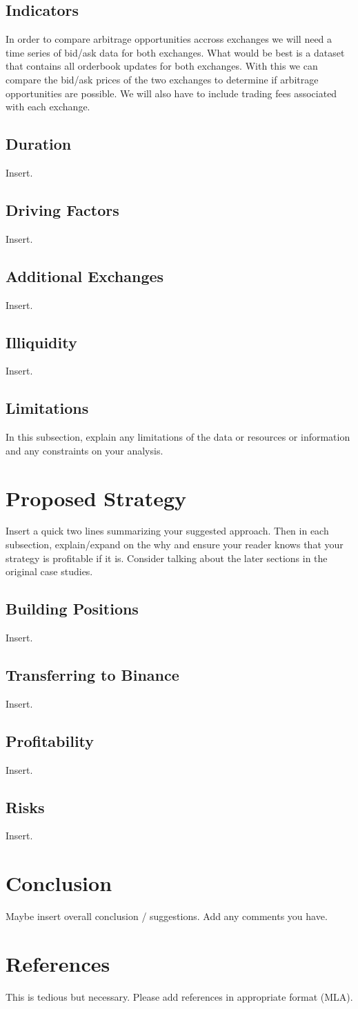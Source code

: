 \documentclass{article}
\begin{document}
\subsection{Indicators}
In order to compare arbitrage opportunities accross exchanges we will need a time series of bid/ask data for both exchanges. What would be best is a dataset that contains all orderbook updates for both exchanges. With this we can compare the bid/ask prices of the two exchanges to determine if arbitrage opportunities are possible. We will also have to include trading fees associated with each exchange.
\subsection{Duration}
Insert.
\subsection{Driving Factors}
Insert.
\subsection{Additional Exchanges}
Insert.
\subsection{Illiquidity}
Insert.
\subsection{Limitations}
In this subsection, explain any limitations of the data or resources or information and any constraints on your analysis.

\section{Proposed Strategy}
Insert a quick two lines summarizing your suggested approach. Then in each subsection, explain/expand on the why and ensure your reader knows that your strategy is profitable if it is. Consider talking about the later sections in the original case studies.
\subsection{Building Positions}
Insert.
\subsection{Transferring to Binance}
Insert.
\subsection{Profitability}
Insert.
\subsection{Risks}
Insert.

\section{Conclusion}
Maybe insert overall conclusion / suggestions. Add any comments you have.

\section{References}
This is tedious but necessary. Please add references in appropriate format (MLA).
\end{document}
